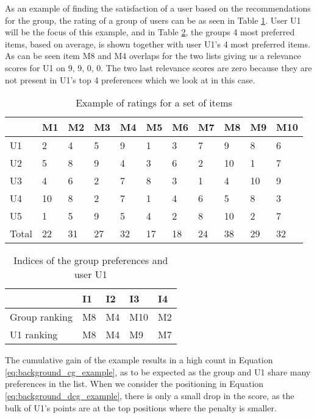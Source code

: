 As an example of finding the satisfaction of a user based on the recommendations for the group, the rating of a group of users can be as seen in Table \ref{tbl:testandeval_bordacount}. User U1 will be the focus of this example, and in Table \ref{tbl:testandeval_positions}, the groups 4 most preferred items, based on average, is shown together with user U1's 4 most preferred items. As can be seen item M8 and M4 overlaps for the two lists giving us a relevance scores for U1 on 9, 9, 0, 0. The two last relevance scores are zero because they are not present in U1's top 4 preferences which we look at in this case.

\begin{table}[H]
	\centering
	\begin{tabular}{|l|l|l|l|l|l|l|l|l|l|l|}
		\hline
		& M1 & M2 & M3 & M4 & M5 & M6 & M7 & M8 & M9 & M10 \\ \hline
		U1    & 2  & 4  & 5  & 9  & 1  & 3  & 7  & 9  & 8  & 6   \\ \hline
		U2    & 5  & 8  & 9  & 4  & 3  & 6  & 2  & 10 & 1  & 7   \\ \hline
		U3    & 4  & 6  & 2  & 7  & 8  & 3  & 1  & 4  & 10 & 9   \\ \hline
		U4    & 10 & 8  & 2  & 7  & 1  & 4  & 6  & 5  & 8  & 3   \\ \hline
		U5    & 1  & 5  & 9  & 5  & 4  & 2  & 8  & 10 & 2  & 7   \\ \hline
		Total & 22 & 31 & 27 & 32 & 17 & 18 & 24 & 38 & 29 & 32  \\ \hline
	\end{tabular}
	\caption{Example of ratings for a set of items}
	\label{tbl:testandeval_bordacount}
\end{table}

\begin{table}[H]
	\centering
	\begin{tabular}{|l|l|l|l|l|}
		\hline
		& I1 & I2 & I3  & I4 \\ \hline
		Group ranking & M8 & M4 & M10 & M2 \\ \hline
		U1 ranking    & M8 & M4 & M9  & M7 \\ \hline
	\end{tabular}
	\caption{Indices of the group preferences and user U1}
	\label{tbl:testandeval_positions}
\end{table}

The cumulative gain of the example results in a high count in Equation \ref{eq:background_cg_example}, as to be expected as the group and U1 share many preferences in the list. When we consider the positioning in Equation \ref{eq:background_dcg_example}, there is only a small drop in the score, as the bulk of U1's points are at the top positions where the penalty is smaller.


